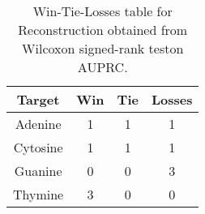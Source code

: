 \begin{table}[H]
\centering
\begin{tabular}{|c|c|c|c|}

\textbf{Target} &  \textbf{Win} &  \textbf{Tie} &  \textbf{Losses} \\
\hline

        Adenine &             1 &             1 &                1 \\
\hline
       Cytosine &             1 &             1 &                1 \\
\hline
        Guanine &             0 &             0 &                3 \\
\hline
        Thymine &             3 &             0 &                0 \\
\hline

\end{tabular}
\caption{Win-Tie-Losses table for Reconstruction obtained from Wilcoxon signed-rank teston AUPRC.}
\label{tab:reconstruction_nucleotides_comparison}
\end{table}